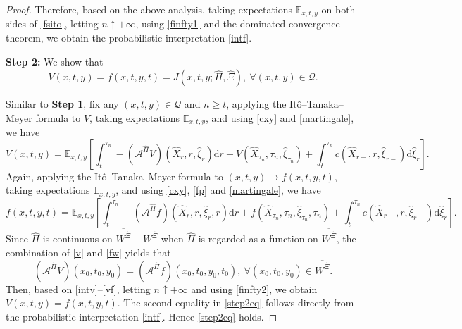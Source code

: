 \documentclass[11pt,reqno]{article}%
\numberwithin{equation}{section}
\begin{document}
\begin{proof}
Therefore, based on the above analysis, taking expectations $\mathbb{E}_{x,t,y}$ on both sides of \eqref{fsito}, letting $n\uparrow+\infty$, using \eqref{finfty1} and the dominated convergence theorem, we obtain the probabilistic interpretation \eqref{intf}.

{\bf Step 2:} We show that
\begin{equation}
\label{step2eq}
V(x,t,y)=f(x,t,y,t)=J\left(x,t,y;\hat{\Pi},\hat{\Xi}\right),\ \forall(x,t,y)\in\mathcal{Q}.
\end{equation}

Similar to {\bf Step 1}, fix any $(x,t,y)\in\mathcal{Q}$ and $n\ge t$, applying the It\^{o}--Tanaka--Meyer formula to $V$, taking expectations $\mathbb{E}_{x,t,y}$, and using \eqref{cxy} and \eqref{martingale}, we have 
\begin{equation}
\label{intv}
V(x,t,y)=\mathbb{E}_{x,t,y}\left[\int_t^{\tau_{n}} -\left(\mathcal{A}^{\hat\Pi}V\right)\left(\hat{X}_r, r, \hat{\xi}_r \right) \mathrm{d} r+V\left(\hat{X}_{\tau_{n}}, \tau_{n},\hat{\xi}_{\tau_{n}}\right)+\int_t^{\tau_{n}} c\left(\hat{X}_{r-}, r, \hat{\xi}_{r-}\right) \mathrm{d} \hat{\xi}_r \right].
\end{equation}
Again, applying the It\^{o}--Tanaka--Meyer formula to $(x,t,y)\mapsto f(x,t,y,t)$, taking expectations $\mathbb{E}_{x,t,y}$, and using \eqref{cxy}, \eqref{fp} and \eqref{martingale}, we have
\begin{equation}
\label{intft}
f(x,t,y,t)=\mathbb{E}_{x,t,y}\left[\int_t^{\tau_{n}} -\left(\mathcal{A}^{\hat\Pi}f\right)\left(\hat{X}_r, r, \hat{\xi}_r,r \right) \mathrm{d} r+ f\left(\hat{X}_{\tau_{n}}, \tau_{n},\hat{\xi}_{\tau_{n}},\tau_{n}\right)+\int_t^{\tau_{n}} c\left(\hat{X}_{r-}, r, \hat{\xi}_{r-}\right) \mathrm{d} \hat{\xi}_r \right].
\end{equation}
Since $\hat{\Pi}$ is continuous on $\overline{W^{\hat{\Xi}}}-W^{\hat{\Xi}}$  when $\hat{\Pi}$ is regarded as a function on $\overline{W^{\hat{\Xi}}}$, the combination of \eqref{v} and \eqref{fw} yields that
\begin{equation}
\label{vf}
\left(\mathcal{A}^{\hat\Pi}V\right)(x_0,t_0,y_0)=\left(\mathcal{A}^{\hat\Pi}f\right)(x_0,t_0,y_0,t_0),\ \forall (x_0,t_0,y_0)\in \overline{W^{\hat{\Xi}}}.
\end{equation}
Then, based on \eqref{intv}--\eqref{vf}, letting $n\uparrow+\infty$ and using \eqref{finfty2}, we obtain $V(x,t,y)=f(x,t,y,t)$. The second equality in \eqref{step2eq} follows directly from the probabilistic interpretation \eqref{intf}. Hence \eqref{step2eq} holds.


\end{proof}
\end{document}
